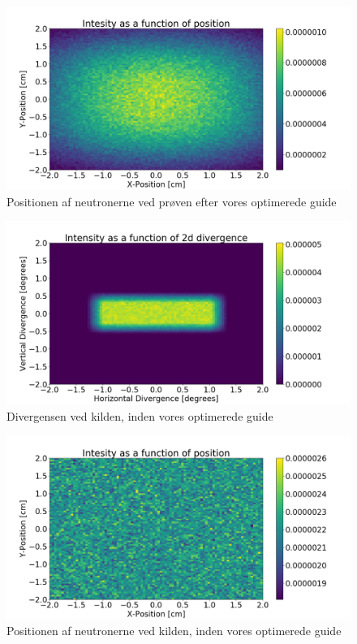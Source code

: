 \documentclass[12pt,oneside,a4paper]{article}
\begin{document}
{{{{{\begin{figure}[H]
\centering
\includegraphics[width=1\textwidth]{psd_after_ess_brill_optimized.png}
\caption{Positionen af neutronerne ved prøven efter vores optimerede guide}
\end{figure}

\begin{figure}[H]
\centering
\includegraphics[width=1\textwidth]{div_before_ess_brill_optimized.png}
\caption{Divergensen ved kilden, inden vores optimerede guide}
\end{figure}

\begin{figure}[H]
\centering
\includegraphics[width=1\textwidth]{psd_before_ess_brill_optimized.png}
\caption{Positionen af neutronerne ved kilden, inden vores optimerede guide}
\end{figure}


}}}}}
\end{document}
